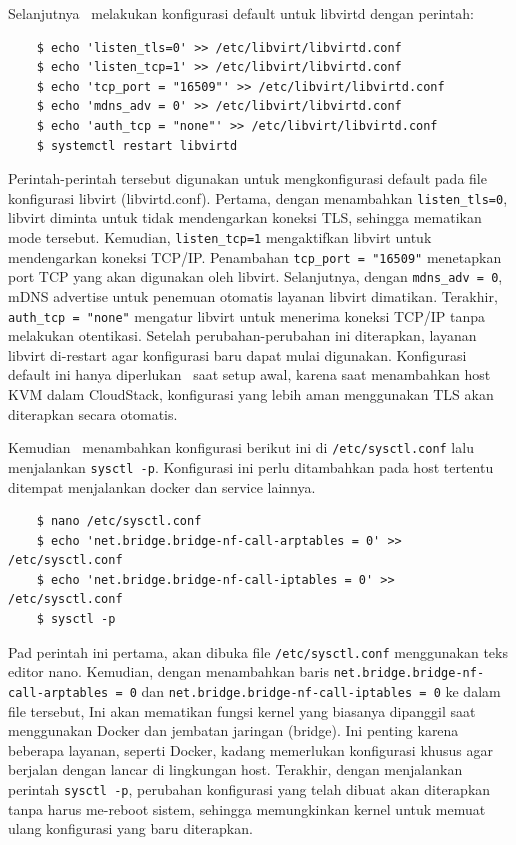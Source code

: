 Selanjutnya \saya\ melakukan konfigurasi default untuk libvirtd dengan perintah:

\begin{listing}[H]
    \begin{verbatim}
    $ echo 'listen_tls=0' >> /etc/libvirt/libvirtd.conf
    $ echo 'listen_tcp=1' >> /etc/libvirt/libvirtd.conf
    $ echo 'tcp_port = "16509"' >> /etc/libvirt/libvirtd.conf
    $ echo 'mdns_adv = 0' >> /etc/libvirt/libvirtd.conf
    $ echo 'auth_tcp = "none"' >> /etc/libvirt/libvirtd.conf
    $ systemctl restart libvirtd
    \end{verbatim}
\end{listing}

Perintah-perintah tersebut digunakan untuk mengkonfigurasi default pada file konfigurasi libvirt (libvirtd.conf). Pertama, dengan menambahkan \texttt{listen\_tls=0}, libvirt diminta untuk tidak mendengarkan koneksi TLS, sehingga mematikan mode tersebut. Kemudian, \texttt{listen\_tcp=1} mengaktifkan libvirt untuk mendengarkan koneksi TCP/IP. Penambahan \texttt{tcp\_port = "16509"} menetapkan port TCP yang akan digunakan oleh libvirt. Selanjutnya, dengan \texttt{mdns\_adv = 0}, mDNS advertise untuk penemuan otomatis layanan libvirt dimatikan. Terakhir, \texttt{auth\_tcp = "none"} mengatur libvirt untuk menerima koneksi TCP/IP tanpa melakukan otentikasi. Setelah perubahan-perubahan ini diterapkan, layanan libvirt di-restart agar konfigurasi baru dapat mulai digunakan. Konfigurasi default ini hanya diperlukan \saya\ saat setup awal, karena saat menambahkan host KVM dalam CloudStack, konfigurasi yang lebih aman menggunakan TLS akan diterapkan secara otomatis.

Kemudian \saya\ menambahkan konfigurasi berikut ini di \texttt{/etc/sysctl.conf} lalu menjalankan \texttt{sysctl -p}. Konfigurasi ini perlu ditambahkan pada host tertentu ditempat menjalankan docker dan service lainnya.

\begin{listing}[H]
    \begin{verbatim}       
    $ nano /etc/sysctl.conf
    $ echo 'net.bridge.bridge-nf-call-arptables = 0' >> /etc/sysctl.conf
    $ echo 'net.bridge.bridge-nf-call-iptables = 0' >> /etc/sysctl.conf
    $ sysctl -p
    \end{verbatim}
\end{listing}

Pad perintah ini pertama, akan dibuka file \texttt{/etc/sysctl.conf} menggunakan teks editor nano. Kemudian, dengan menambahkan baris \texttt{net.bridge.bridge-nf-call-arptables = 0} dan \texttt{net.bridge.bridge-nf-call-iptables = 0} ke dalam file tersebut, Ini akan mematikan fungsi kernel yang biasanya dipanggil saat menggunakan Docker dan jembatan jaringan (bridge). Ini penting karena beberapa layanan, seperti Docker, kadang memerlukan konfigurasi khusus agar berjalan dengan lancar di lingkungan host. Terakhir, dengan menjalankan perintah \texttt{sysctl -p}, perubahan konfigurasi yang telah dibuat akan diterapkan tanpa harus me-reboot sistem, sehingga memungkinkan kernel untuk memuat ulang konfigurasi yang baru diterapkan.

